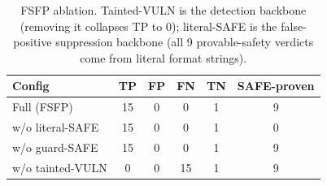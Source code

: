 \begin{table}[t]
\centering
\small
\begin{tabular}{lccccc}
\toprule
Config & TP & FP & FN & TN & SAFE-proven \\
\midrule
  Full (FSFP) & 15 & 0 & 0 & 1 & 9 \\
  w/o literal-SAFE & 15 & 0 & 0 & 1 & 0 \\
  w/o guard-SAFE & 15 & 0 & 0 & 1 & 9 \\
  w/o tainted-VULN & 0 & 0 & 15 & 1 & 9 \\
\bottomrule
\end{tabular}
\caption{FSFP ablation. Tainted-VULN is the detection backbone
(removing it collapses TP to 0); literal-SAFE is the false-positive
suppression backbone (all 9 provable-safety verdicts come from literal
format strings).}
\label{tab:fmt_ablation}
\end{table}
